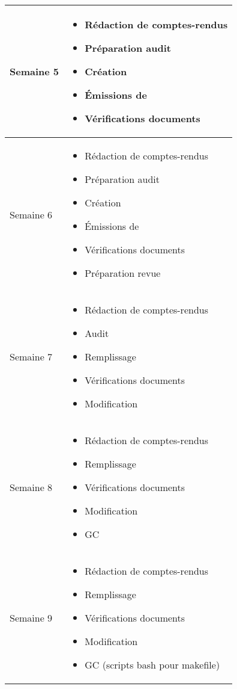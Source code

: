 \documentclass [a4paper] {article}
\begin{document}
\section*{\Pierre}

\begin{tabularx}{16.8cm}{|>{\columncolor{gray!40}}l|X|}
	\hline
	Semaine 5 & \begin{itemize}
	\item Rédaction de comptes-rendus
	\item Préparation audit
	\item Création \TB{}
	\item Émissions de \FT{}
	\item Vérifications documents
\end{itemize}	 \\
	\hline
	
	Semaine 6 & \begin{itemize}
	\item Rédaction de comptes-rendus
	\item Préparation audit
	\item Création \TB{}
	\item Émissions de \FT{}
	\item Vérifications documents
	\item Préparation revue
\end{itemize}	 \\
	\hline
	
	Semaine 7 & \begin{itemize}
	\item Rédaction de comptes-rendus
	\item Audit
	\item Remplissage \TB{}
	\item Vérifications documents
	\item Modification \PQ{}
\end{itemize}	 \\
	\hline
	
	Semaine 8 & \begin{itemize}
	\item Rédaction de comptes-rendus
	\item Remplissage \TB{}
	\item Vérifications documents
	\item Modification \PQ{}
	\item GC
\end{itemize}	 \\
	\hline
	
	Semaine 9 & \begin{itemize}
	\item Rédaction de comptes-rendus
	\item Remplissage \TB{}
	\item Vérifications documents
	\item Modification \PQ{}
	\item GC (scripts bash pour makefile)
	
\end{itemize}	 \\
	\hline
	
\end{tabularx}
\end{document}

